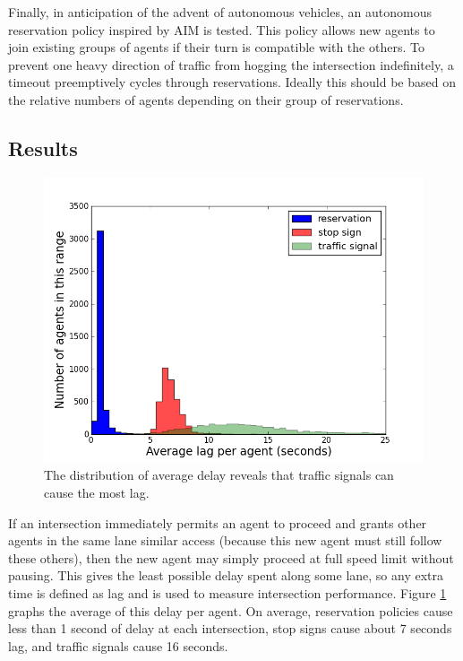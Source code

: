 \documentclass[letterpaper, 10 pt, conference]{ieeeconf}  %
\begin{document}
Finally, in anticipation of the advent of autonomous vehicles, an autonomous
reservation policy inspired by AIM \cite{JAIR08-dresner} is tested. This policy
allows new agents to join existing groups of agents if their turn is compatible
with the others. To prevent one heavy direction of traffic from hogging the
intersection indefinitely, a timeout preemptively cycles through reservations.
Ideally this should be based on the relative numbers of agents depending on
their group of reservations. 

\subsection{Results}

\begin{figure}[h]
  \centering \includegraphics[width=\linewidth]{avg_lag_agent_atx.png}
  \caption{The distribution of average delay reveals that traffic signals can
           cause the most lag.}
  \label{fig:avg_lag}
  \vspace{-10pt}
\end{figure}

If an intersection immediately permits an agent to proceed and grants other
agents in the same lane similar access (because this new agent must still follow
these others), then the new agent may simply proceed at full speed limit without
pausing. This gives the least possible delay spent along some lane, so any extra
time is defined as lag and is used to measure intersection performance. Figure
\ref{fig:avg_lag} graphs the average of this delay per agent. On average,
reservation policies cause less than 1 second of delay at each intersection,
stop signs cause about 7 seconds lag, and traffic signals cause 16 seconds.
\end{document}

